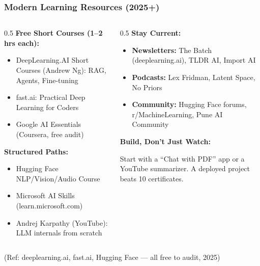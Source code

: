 \begin{frame}[fragile]\frametitle{Modern Learning Resources (2025+)}
\begin{columns}
    \begin{column}[T]{0.5\linewidth}
\textbf{Free Short Courses (1--2 hrs each):}
\begin{itemize}
\item DeepLearning.AI Short Courses (Andrew Ng): RAG, Agents, Fine-tuning
\item fast.ai: Practical Deep Learning for Coders
\item Google AI Essentials (Coursera, free audit)
\end{itemize}

\textbf{Structured Paths:}
\begin{itemize}
\item Hugging Face NLP/Vision/Audio Course
\item Microsoft AI Skills (learn.microsoft.com)
\item Andrej Karpathy (YouTube): LLM internals from scratch
\end{itemize}
    \end{column}
    \begin{column}[T]{0.5\linewidth}
\textbf{Stay Current:}
\begin{itemize}
\item \textbf{Newsletters:} The Batch (deeplearning.ai), TLDR AI, Import AI
\item \textbf{Podcasts:} Lex Fridman, Latent Space, No Priors
\item \textbf{Community:} Hugging Face forums, r/MachineLearning, Pune AI Community
\end{itemize}

\vspace{0.2cm}
\textbf{Build, Don't Just Watch:}

Start with a ``Chat with PDF'' app or a YouTube summarizer. A deployed project beats 10 certificates.
    \end{column}
\end{columns}
{\tiny (Ref: deeplearning.ai, fast.ai, Hugging Face --- all free to audit, 2025)}
\end{frame}

